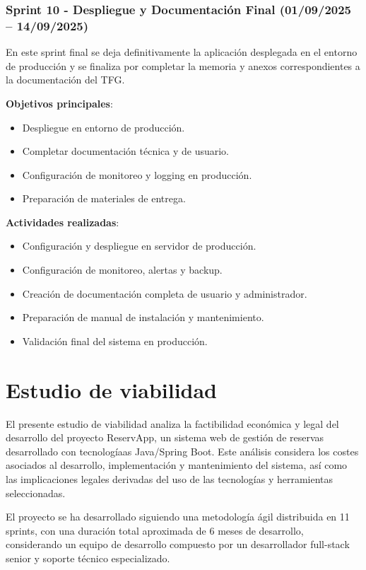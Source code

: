\subsubsection{Sprint 10 - Despliegue y Documentación Final (01/09/2025 – 14/09/2025)} 
En este sprint final se deja definitivamente la aplicación desplegada en el entorno de producción y se finaliza por completar la memoria y anexos correspondientes a la documentación del TFG.

\textbf{Objetivos principales}:
\begin{itemize}
\tightlist
\item
Despliegue en entorno de producción.
\item
Completar documentación técnica y de usuario.
\item
Configuración de monitoreo y logging en producción.
\item
Preparación de materiales de entrega.
\end{itemize}

\textbf{Actividades realizadas}:
\begin{itemize}
\tightlist
\item
Configuración y despliegue en servidor de producción.
\item
Configuración de monitoreo, alertas y backup.
\item
Creación de documentación completa de usuario y administrador.
\item
Preparación de manual de instalación y mantenimiento.
\item
Validación final del sistema en producción.
\end{itemize}


\section{Estudio de viabilidad}
El presente estudio de viabilidad analiza la factibilidad económica y legal del desarrollo del proyecto ReservApp, un sistema web de gestión de reservas desarrollado con tecnologíaas Java/Spring Boot. Este análisis considera los costes asociados al desarrollo, implementación y mantenimiento del sistema, así como las implicaciones legales derivadas del uso de las tecnologías y herramientas seleccionadas.

El proyecto se ha desarrollado siguiendo una metodología ágil distribuida en 11 sprints, con una duración total aproximada de 6 meses de desarrollo, considerando un equipo de desarrollo compuesto por un desarrollador full-stack senior y soporte técnico especializado.

